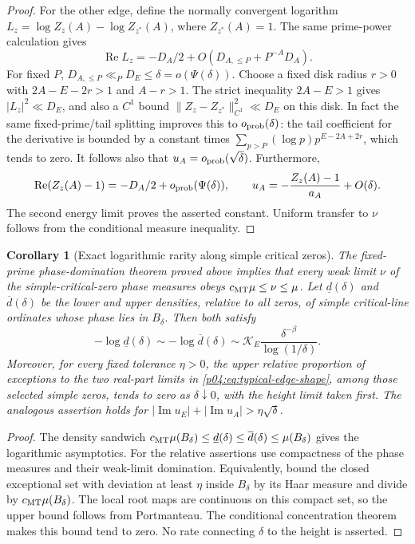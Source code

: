 \documentclass[11pt,letterpaper]{article}
\newtheorem{corollary}[theorem]{Corollary}
\theoremstyle{definition}
\theoremstyle{remark}
\renewcommand{\Re}{\operatorname{Re}}
\renewcommand{\Im}{\operatorname{Im}}
\newcommand{\1}{\mathbf 1}
\begin{document}
\begin{proof}
For the other edge, define the normally convergent logarithm
$L_z=\log Z_z(A)-\log Z_{z^*}(A)$, where $Z_{z^*}(A)=1$.
The same prime-power calculation gives
\[
 \Re L_z=-D_A/2+O(D_{A,\le P}+P^{-A}D_A).
\]
For fixed $P$, $D_{A,\le P}\ll_P D_E\le\delta=o(\Psi(\delta))$.
Choose a fixed disk radius $r>0$ with $2A-E-2r>1$ and $A-r>1$.
The strict inequality $2A-E>1$ gives $|L_z|^2\ll D_E$, and
also a $C^1$ bound $\|Z_z-Z_{z^*}\|_{C^1}^2\ll D_E$ on this
disk. In fact the same fixed-prime/tail splitting improves this
to $o_{\rm prob}(\delta)$: the tail coefficient for the derivative
is bounded by a constant times
$\sum_{p>P}(\log p)p^{E-2A+2r}$, which tends to zero.
It follows also that $u_A=o_{\rm prob}(\sqrt\delta)$. Furthermore,
\[
 \Re(Z_z(A)-1)=-D_A/2+o_{\rm prob}(\Psi(\delta)),\qquad
 u_A=-\frac{Z_z(A)-1}{a_A}+O(\delta).
\]
The second energy limit proves the asserted constant. Uniform
transfer to $\nu$ follows from the conditional measure inequality.
\end{proof}

\begin{corollary}[Exact logarithmic rarity along simple critical zeros]
\label{p04:cor:exact-simple-rarity}
The fixed-prime phase-domination theorem proved above implies that every
weak limit $\nu$ of the simple-critical-zero phase measures obeys
$c_{\rm MT}\mu\le\nu\le\mu$. Let $\underline d(\delta)$ and
$\overline d(\delta)$ be the lower and upper densities, relative
to all zeros, of simple critical-line ordinates whose phase lies in
$B_\delta$. Then both satisfy
\[
 -\log\underline d(\delta)\sim
 -\log\overline d(\delta)\sim
 \mathcal K_E\frac{\delta^{-\beta}}{\log(1/\delta)}.
\]
Moreover, for every fixed tolerance $\eta>0$, the upper relative
proportion of exceptions to the two real-part limits in
\eqref{p04:eq:typical-edge-shape}, among those selected simple zeros,
tends to zero as $\delta\downarrow0$, with the height limit taken
first. The analogous assertion holds for
$|\Im u_E|+|\Im u_A|>\eta\sqrt\delta$.
\end{corollary}

\begin{proof}
The density sandwich
$c_{\rm MT}\mu(B_\delta)\le\underline d(\delta)
\le\overline d(\delta)\le\mu(B_\delta)$ gives the logarithmic
asymptotics. For the relative assertions use compactness of the
phase measures and their weak-limit domination. Equivalently,
bound the closed exceptional set with deviation at least $\eta$
inside $B_\delta$ by its Haar measure and divide by
$c_{\rm MT}\mu(B_\delta)$. The local root maps are continuous
on this compact set, so the upper bound follows from Portmanteau.
The conditional concentration theorem makes this bound tend to
zero. No rate connecting $\delta$ to the height is asserted.
\end{proof}
\end{document}
